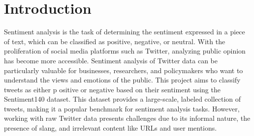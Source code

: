 \documentclass[conference]{IEEEtran}
\begin{document}
\section{Introduction}
Sentiment analysis is the task of determining the sentiment expressed in a piece of text, 
which can be classified as positive, negative, or neutral. With the proliferation of social media platforms such as Twitter, 
analyzing public opinion has become more accessible. Sentiment analysis of Twitter data can be particularly valuable for businesses, 
researchers, and policymakers who want to understand the views and emotions of the public. This project aims to classify tweets as either p
ositive or negative based on their sentiment using the Sentiment140 dataset. This dataset provides a large-scale, labeled collection of tweets, 
making it a popular benchmark for sentiment analysis tasks. However, working with raw Twitter data presents challenges due to its informal nature, 
the presence of slang, and irrelevant content like URLs and user mentions.
\end{document}
